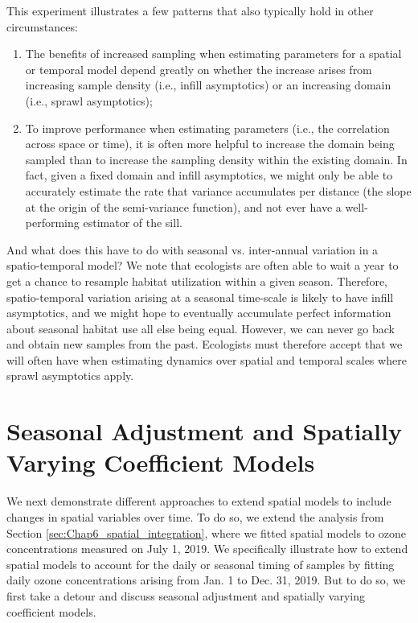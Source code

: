 This experiment illustrates a few patterns that also typically hold in other circumstances:
\begin{enumerate}
    \item The benefits of increased sampling when estimating parameters for a spatial or temporal model depend greatly on whether the increase arises from increasing sample density (i.e., infill asymptotics) or an increasing domain (i.e., sprawl asymptotics);

    \item To improve performance when estimating parameters (i.e., the correlation across space or time), it is often more helpful to increase the domain being sampled than to increase the sampling density within the existing domain.  In fact, given a fixed domain and infill asymptotics, we might only be able to accurately estimate the rate that variance accumulates per distance (the slope at the origin of the semi-variance function), and not ever have a well-performing estimator of the sill.
\end{enumerate}

And what does this have to do with seasonal vs. inter-annual variation in a spatio-temporal model?  We note that ecologists are often able to wait a year to get a chance to resample habitat utilization within a given season.  Therefore, spatio-temporal variation arising at a seasonal time-scale is likely to have infill asymptotics, and we might hope to eventually accumulate perfect information about seasonal habitat use all else being equal.  However, we can never go back and obtain new samples from the past.  Ecologists must therefore accept that we will often have  \cite{doak_understanding_2008} when estimating dynamics over spatial and temporal scales where sprawl asymptotics apply.  

\section{Seasonal Adjustment and Spatially Varying Coefficient Models} 

We next demonstrate different approaches to extend spatial models to include changes in spatial variables over time.  To do so, we extend the analysis from Section \ref{sec:Chap6_spatial_integration}, where we fitted spatial models to ozone concentrations measured on July 1, 2019.  We specifically illustrate how to extend spatial models to account for the daily or seasonal timing of samples by fitting daily ozone concentrations arising from Jan. 1 to Dec. 31, 2019.  But to do so, we first take a detour and discuss seasonal adjustment and spatially varying coefficient models.

